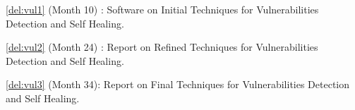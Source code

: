 \begin{Workpackage}{\thewpno}
%
%
%
%







\begin{WPDeliverables}
  \begin{compactitem}
  \item \ref{del:vul1} (Month 10) : Software on Initial Techniques for Vulnerabilities Detection and Self Healing.
  \item \ref{del:vul2} (Month 24) : Report on Refined Techniques for Vulnerabilities Detection and Self Healing.
  \item \ref{del:vul3} (Month 34): Report on Final Techniques for Vulnerabilities Detection and Self Healing.
\end{compactitem}
\end{WPDeliverables}

\end{Workpackage}
